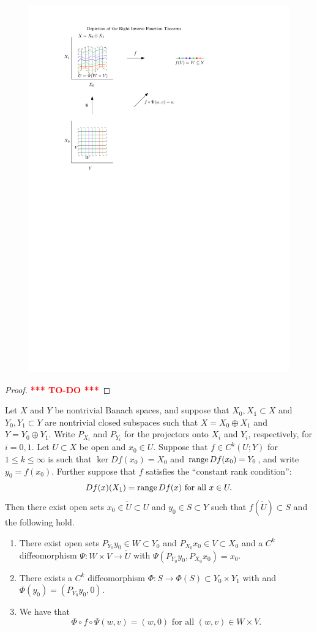 \documentclass[a4paper]{article}
\newcommand{\TODO}{\textcolor{red}{\textbf{*** TO-DO ***}}}
\begin{document}
\begin{figure}[!ht]
  \centering
  \includegraphics[width=0.7\linewidth]{fig/right_inverse.pdf}
\end{figure}

\begin{proof}
\TODO
\end{proof}

\begin{thm}
Let $X$ and $Y$ be nontrivial Banach spaces, and suppose 
that $X_0,X_1 \subset X$ and $Y_0,Y_1 \subset Y$ are 
nontrivial closed subspaces such that $X = X_0 \oplus 
X_1$ and $Y = Y_0 \oplus Y_1$.  Write $P_{X_i}$ and 
$P_{Y_i}$ for the projectors onto $X_i$ and $Y_i$, 
respectively, for $i=0,1$.  Let $U \subset X$ be 
open and $x_0 \in U$.  Suppose that $f \in C^k(U;Y)$ 
for $1 \le k\le \infty$ is such that $\ker Df(x_0) = 
X_0$ and $\operatorname{range} Df(x_0) = Y_0$, and write $y_0 = f(x_0)$.  
Further suppose that $f$ satisfies the ``constant rank 
condition'':
\[
Df(x) (X_1) = \operatorname{range} Df(x) \text{ for all }x \in U. 
\]
Then there exist open sets $x_0 \in \tilde{U} \subset U$ 
and $y_0 \in S \subset Y$ such that $f(\tilde{U}) 
\subset S$ and the following hold.
\begin{enumerate} 
\item There exist open sets $P_{Y_0} y_0 \in W \subset 
Y_0$ and $P_{X_0} x_0 \in V \subset X_0$ and a $C^k$ 
diffeomorphism $\Psi: W \times V \to \tilde{U}$ with 
$\Psi(P_{Y_0} y_0, P_{X_0} x_0) = x_0$.

\item There exists a $C^k$ diffeomorphism $\Phi : S \to 
\Phi(S) \subset Y_0 \times Y_1$ with  
and $\Phi(y_0) = (P_{Y_0} y_0, 0)$.

\item We have that 
\[
\Phi \circ f \circ \Psi(w,v) = (w,0) \text{ for all } 
(w, v) \in W \times V.
\]
\end{enumerate}
\end{thm}
\end{document}
